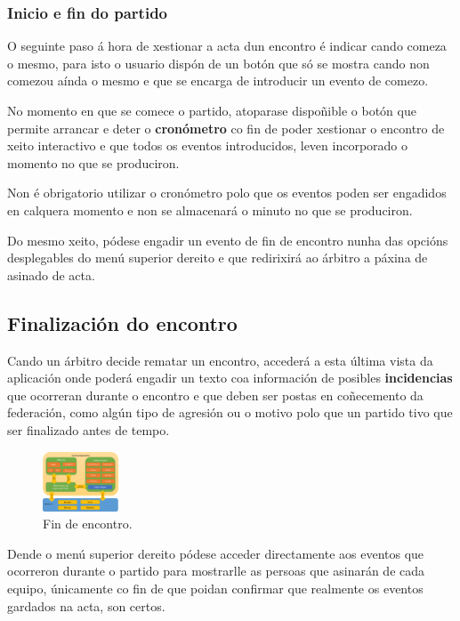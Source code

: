       \subsubsection{Inicio e fin do partido}
      O seguinte paso á hora de xestionar a acta dun encontro é indicar cando 
comeza o mesmo, para isto o usuario dispón de un botón que só se mostra cando 
non comezou aínda o mesmo e que se encarga de introducir un evento de comezo.

      No momento en que se comece o partido, atoparase dispoñible o botón 
que permite arrancar e deter o \textbf{cronómetro} co fin de poder xestionar o 
encontro de xeito interactivo e que todos os eventos introducidos, leven 
incorporado o momento no que se produciron.

      Non é obrigatorio utilizar o cronómetro polo que os eventos poden ser 
engadidos en calquera momento e non se almacenará o minuto no que se produciron.

      Do mesmo xeito, pódese engadir un evento de fin de encontro nunha das 
opcións desplegables do menú superior dereito e que redirixirá ao árbitro a 
páxina de asinado de acta.

    \subsection{Finalización do encontro}
    Cando un árbitro decide rematar un encontro, accederá a esta última vista 
da aplicación onde poderá engadir un texto coa información de posibles 
\textbf{incidencias} que ocorreran durante o encontro e que deben ser postas en 
coñecemento da federación, como algún tipo de agresión ou o motivo polo que un 
partido tivo que ser finalizado antes de tempo.

    \begin{figure}[h!]
      \begin{center}
      \includegraphics[width=0.2\textwidth]{./img/cordova_arquitectura.png}
      \caption{Fin de encontro.}
      \end{center}
    \end{figure}

    Dende o menú superior dereito pódese acceder directamente aos eventos que 
ocorreron durante o partido para mostrarlle as persoas que asinarán de cada 
equipo, únicamente co fin de que poidan confirmar que realmente os eventos 
gardados na acta, son certos.


